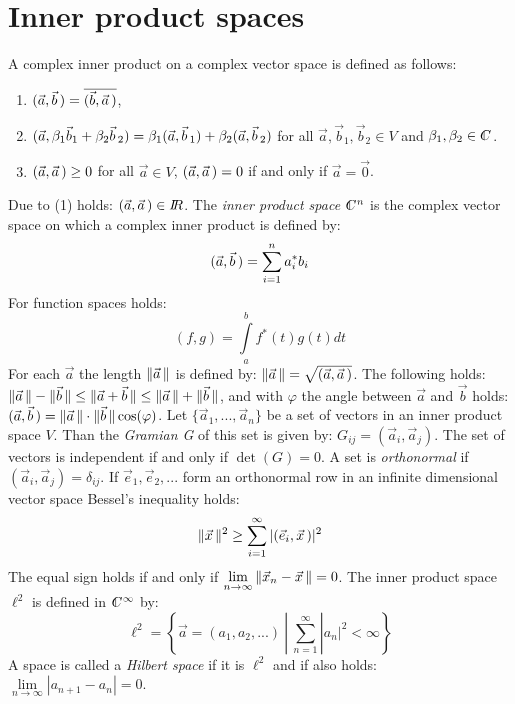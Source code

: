 \documentclass[twoside]{report}
\begin{document}
\section{Inner product spaces}
A complex inner product on a complex vector space is defined as follows:
\begin{enumerate}
\item $(\vec{a},\vec{b}\,)=\overline{(\vec{b},\vec{a}\,)}$,
\item $(\vec{a},\beta_1\vec{b}_1+\beta_2\vec{b}\,_2)=\beta_1(\vec{a},\vec{b}\,_1)+\beta_2(\vec{a},\vec{b}\,_2)$
      for all $\vec{a},\vec{b}_1,\vec{b}_2\in V$ and $\beta_1,\beta_2\in\CC$.
\item $(\vec{a},\vec{a}\,)\geq0$ for all $\vec{a}\in V$,
      $(\vec{a},\vec{a}\,)=0$ if and only if $\vec{a}=\vec{0}$.
\end{enumerate}
Due to (1) holds: $(\vec{a},\vec{a}\,)\in I\hspace{-1mm}R$. The {\it inner product space} $\CC^n$ is
the complex vector space on which a complex inner product is defined by:
\[
(\vec{a},\vec{b}\,)=\sum_{i=1}^na_i^*b_i
\]
For function spaces holds:
\[
(f,g)=\int\limits_a^bf^*(t)g(t)dt
\]
For each $\vec{a}$ the length $\|\vec{a}\,\|$ is defined by:
$\|\vec{a}\,\|=\sqrt{(\vec{a},\vec{a}\,)}$. The following holds:
$\|\vec{a}\,\|-\|\vec{b}\,\|\leq\|\vec{a}+\vec{b}\,\|\leq\|\vec{a}\,\|+\|\vec{b}\,\|$,
and with $\varphi$ the angle between $\vec{a}$ and $\vec{b}$ holds:
$(\vec{a},\vec{b}\,)=\|\vec{a}\,\|\cdot\|\vec{b}\,\|\cos(\varphi)$.
\npar
Let $\{\vec{a}_1,...,\vec{a}_n\}$ be a set of vectors in an inner product space
$V$. Than the {\it Gramian G} of this set is given by: $G_{ij}=(\vec{a}_i,\vec{a}_j)$.
The set of vectors is independent if and only if $\det(G)=0$.
\npar
A set is {\it orthonormal} if $(\vec{a}_i,\vec{a}_j)=\delta_{ij}$.
If $\vec{e}_1,\vec{e}_2,...$ form an orthonormal row in an infinite dimensional
vector space Bessel's inequality holds:
\[
\|\vec{x}\,\|^2\geq\sum_{i=1}^\infty|(\vec{e}_i,\vec{x}\,)|^2
\]
The equal sign holds if and only if
$\lim\limits_{n\rightarrow\infty}\|\vec{x}_n-\vec{x}\,\|=0$.
\npar
The inner product space $\ell^2$ is defined in $\CC^\infty$ by:
\[
\ell^2=\left\{\vec{a}=(a_1,a_2,...)~|~\sum_{n=1}^\infty|a_n|^2<\infty\right\}
\]
A space is called a {\it Hilbert space} if it is $\ell^2$ and if also holds:
$\lim\limits_{n\rightarrow\infty}|a_{n+1}-a_n|=0$.
\end{document}
